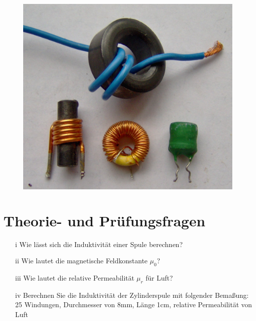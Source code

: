 

\begin{figure}
 \vspace{-18cm}
 \includegraphics[scale=0.1]{Spule/Bilder/Electronic_component_inductors.jpg}
 \vspace{-18cm}
\end{figure}

\section{Theorie- und Prüfungsfragen} 

\begin{enumerate}
\itemsep1pt\parskip0pt
\item[i] Wie lässt sich die Induktivität einer Spule berechnen?
\item[ii] Wie lautet die magnetische Feldkonstante $\mu_0$?
\item[iii] Wie lautet die relative Permeabilität $\mu_r$ für Luft?
\item[iv] Berechnen Sie die Induktivität der Zylinderspule mit folgender Bemaßung: 25 Windungen, 	Durchmesser von 8mm, Länge 1cm, relative Permeabilität von Luft
\end{enumerate}



